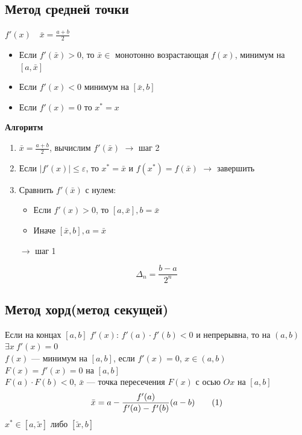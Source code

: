\documentclass[oneside]{book}
\newcommand\addtag{\refstepcounter{equation}\tag{\theequation}}
\theoremstyle{plain}
\theoremstyle{remark}
\theoremstyle{definition}
\begin{document}
\subsection{Метод средней точки}
\label{sec:org934bcfa}
\(f'(x)\quad \bar{x} = \frac{a + b}{2}\) \\
\begin{itemize}
\item Если \(f'(\bar{x}) > 0\), то \(\bar{x}\in\) монотонно возрастающая
\(f(x)\), минимум на \([a, \bar{x}]\)
\item Если \(f'(x) < 0\) минимум на \([\bar{x}, b]\)
\item Если \(f'(x) = 0\) то \(x^* = x\)
\end{itemize}

\textbf{Алгоритм}
\begin{enumerate}
\item \(\bar{x} = \frac{a + b}{2}\), вычислим \(f'(\bar{x})\) \(\rightarrow\) шаг
2
\item Если \(|f'(x)| \le \varepsilon\), то \(x^* = \bar{x}\) и \(f(x^*) =
   f(\bar{x})\) \(\rightarrow\) завершить
\item Сравнить \(f'(\bar{x})\) с нулем:
\begin{itemize}
\item Если \(f'(x) > 0\), то \([a, \bar{x}], b = \bar{x}\)
\item Иначе \([\bar{x}, b], a=\bar{x}\)
\end{itemize}
\(\rightarrow\) шаг 1
\end{enumerate}
\[ \Delta_n = \frac{b - a}{2^n} \]
\subsection{Метод хорд(метод секущей)}
\label{sec:org07e89dd}
Если на концах \([a, b]\) \(f'(x)\): \(f'(a)\cdot f'(b) < 0\) и непрерывна,
то на \((a, b)\) \(\exists x\ f'(x) = 0\) \\
\(f(x)\) --- минимум на \([a, b]\), если \(f'(x) = 0\), \(x\in(a, b)\) \\
\(F(x) = f'(x) = 0\) на \([a, b]\) \\
\(F(a)\cdot F(b) < 0\), \(\bar{x}\) --- точка пересечения \(F(x)\) с осью \(Ox\) на \([a, b]\)
\[ \bar{x} = a - \frac{f'(a)}{f'(a) - f'(b)}(a - b) \label{hord_1_4}\addtag\]
\(x^* \in [a, \tilde{x}]\) либо \([\tilde{x}, b]\)
\end{document}
